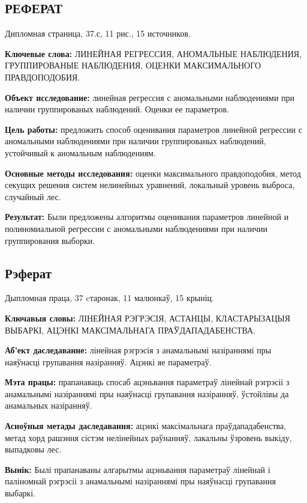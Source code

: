 \begin{center}
    \section*{РЕФЕРАТ}
\end{center}

Дипломная страница, 37.с, 11 рис., 15 источников.

\textbf{Ключевые слова:} ЛИНЕЙНАЯ РЕГРЕССИЯ, АНОМАЛЬНЫЕ НАБЛЮДЕНИЯ, ГРУППИРОВАНЫЕ НАБЛЮДЕНИЯ, ОЦЕНКИ МАКСИМАЛЬНОГО ПРАВДОПОДОБИЯ.

\textbf{Объект исследование:} линейная регрессия с аномальными наблюдениями при наличии группированых наблюдений. Оценки ее параметров.

\textbf{Цель работы:} предложить способ оценивания параметров линейной регрессии с аномальными наблюдениями при наличии группированых наблюдений, устойчивый к аномальным наблюдениям.

\textbf{Основные методы исследования:} оценки максимального правдоподобия, метод секущих решения систем нелинейных уравнений, локальный уровень выброса, случайный лес.

\textbf{Результат:} Были предложены алгоритмы оценивания параметров линейной и полиномиальной регрессии с аномальными наблюдениями при наличии группирования выборки.

\newpage

\begin{otherlanguage}{belarusian}

\begin{center}
    \section*{Рэферат}
\end{center}
Дыпломная праца, 37 cтаронак, 11 малюнкаў, 15 крыніц.

\textbf{Ключавыя словы:}  ЛІНЕЙНАЯ РЭГРЭСІЯ, АСТАНЦЫ, КЛАСТАРЫЗАЦЫЯ ВЫБАРКІ, АЦЭНКІ МАКСІМАЛЬНАГА ПРАЎДАПАДАБЕНСТВА.

\textbf{Аб'ект даследаванне:} лінейная рэгрэсія з анамальнымі назіраннямі пры наяўнасці групавання назіранняў. Ацэнкі яе параметраў.

\textbf{Мэта працы:} прапанаваць спосаб ацэньвання параметраў лінейнай рэгрэсіі з анамальнымі назіраннямі пры наяўнасці групавання назіранняў, ўстойлівы да анамальных назіранняў.

\textbf{Асноўныя метады даследавання:} ацэнкі максімальнага праўдападабенства, метад хорд рашэння сістэм нелінейных раўнанняў, лакальны ўзровень выкіду, выпадковы лес.

\textbf{Вынік:} Былі прапанаваны алгарытмы ацэньвання параметраў лінейнай і паліномнай рэгрэсіі з анамальнымі назіраннямі пры наяўнасці групавання выбаркі.

\end{otherlanguage}

